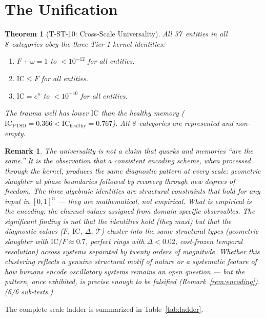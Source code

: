 \documentclass[
  aps,
  prd,
  twocolumn,
  superscriptaddress,
  nofootinbib,
  floatfix
]{revtex4-2}
\newtheorem{theorem}{Theorem}
\newtheorem{remark}{Remark}
\newcommand{\IC}{\mathrm{IC}}
\begin{document}
\section{The Unification}\label{sec:unification}

\begin{theorem}[T-ST-10: Cross-Scale Universality]
\label{thm:T10}
All 37~entities in all 8~categories obey the three Tier-1
kernel identities:
\begin{enumerate}
\item $F + \omega = 1$ to $< 10^{-12}$ for all entities.
\item $\IC \leq F$ for all entities.
\item $\IC = e^{\kappa}$ to $< 10^{-10}$ for all entities.
\end{enumerate}
The trauma well has lower $\IC$ than the healthy memory
($\IC_{\text{PTSD}} = 0.366 < \IC_{\text{healthy}} = 0.767$).
All 8~categories are represented and non-empty.
\end{theorem}

\begin{remark}
The universality is not a claim that quarks and memories
``are the same.''  It is the observation that a consistent
encoding scheme, when processed through the kernel, produces
the same diagnostic pattern at every scale: geometric
slaughter at phase boundaries followed by recovery through
new degrees of freedom.  The three algebraic identities are
structural constraints that hold for \emph{any} input in
$[0,1]^n$ --- they are mathematical, not empirical.  What is
empirical is the encoding: the channel values assigned from
domain-specific observables.  The significant finding is not
that the identities hold (they must) but that the
\emph{diagnostic values} ($F$, $\IC$, $\Delta$, $\mathcal{T}$)
cluster into the same structural types (geometric slaughter
with $\IC/F \approx 0.7$, perfect rings with $\Delta < 0.02$,
cost-frozen temporal resolution) across systems separated by
twenty orders of magnitude.  Whether this clustering reflects
a genuine structural motif of nature or a systematic feature
of how humans encode oscillatory systems remains an open
question --- but the pattern, once exhibited, is precise
enough to be falsified (Remark~\ref{rem:encoding}).
(6/6 sub-tests.)
\end{remark}

The complete scale ladder is summarized in
Table~\ref{tab:ladder}.
\end{document}
